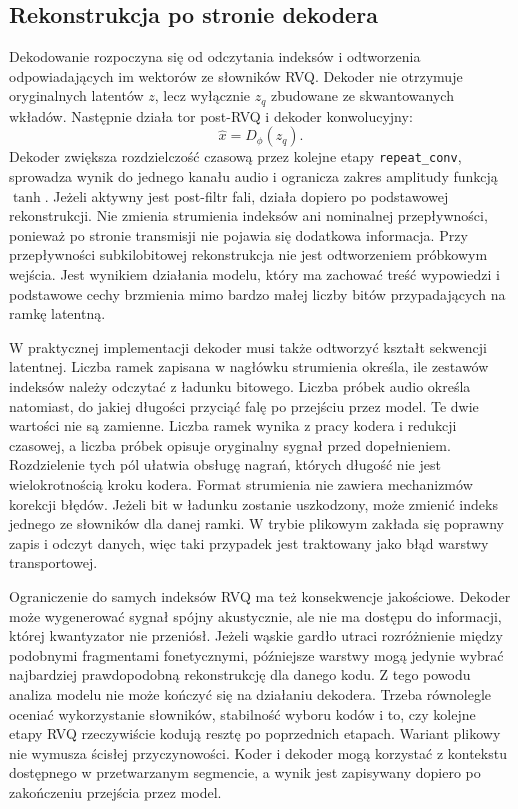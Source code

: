 \subsection{Rekonstrukcja po stronie dekodera}

Dekodowanie rozpoczyna się od odczytania indeksów i odtworzenia odpowiadających im wektorów ze słowników RVQ. Dekoder nie otrzymuje oryginalnych latentów \(z\), lecz wyłącznie \(z_q\) zbudowane ze skwantowanych wkładów. Następnie działa tor post-RVQ i dekoder konwolucyjny:
\[
\hat{x} = D_\phi(z_q).
\]
Dekoder zwiększa rozdzielczość czasową przez kolejne etapy \texttt{repeat\_conv}, sprowadza wynik do jednego kanału audio i ogranicza zakres amplitudy funkcją \(\tanh\). Jeżeli aktywny jest post-filtr fali, działa dopiero po podstawowej rekonstrukcji. Nie zmienia strumienia indeksów ani nominalnej przepływności, ponieważ po stronie transmisji nie pojawia się dodatkowa informacja. Przy przepływności subkilobitowej rekonstrukcja nie jest odtworzeniem próbkowym wejścia. Jest wynikiem działania modelu, który ma zachować treść wypowiedzi i podstawowe cechy brzmienia mimo bardzo małej liczby bitów przypadających na ramkę latentną.

W praktycznej implementacji dekoder musi także odtworzyć kształt sekwencji latentnej. Liczba ramek zapisana w nagłówku strumienia określa, ile zestawów indeksów należy odczytać z ładunku bitowego. Liczba próbek audio określa natomiast, do jakiej długości przyciąć falę po przejściu przez model. Te dwie wartości nie są zamienne. Liczba ramek wynika z pracy kodera i redukcji czasowej, a liczba próbek opisuje oryginalny sygnał przed dopełnieniem. Rozdzielenie tych pól ułatwia obsługę nagrań, których długość nie jest wielokrotnością kroku kodera. Format strumienia nie zawiera mechanizmów korekcji błędów. Jeżeli bit w ładunku zostanie uszkodzony, może zmienić indeks jednego ze słowników dla danej ramki. W trybie plikowym zakłada się poprawny zapis i odczyt danych, więc taki przypadek jest traktowany jako błąd warstwy transportowej.

Ograniczenie do samych indeksów RVQ ma też konsekwencje jakościowe. Dekoder może wygenerować sygnał spójny akustycznie, ale nie ma dostępu do informacji, której kwantyzator nie przeniósł. Jeżeli wąskie gardło utraci rozróżnienie między podobnymi fragmentami fonetycznymi, późniejsze warstwy mogą jedynie wybrać najbardziej prawdopodobną rekonstrukcję dla danego kodu. Z tego powodu analiza modelu nie może kończyć się na działaniu dekodera. Trzeba równolegle oceniać wykorzystanie słowników, stabilność wyboru kodów i to, czy kolejne etapy RVQ rzeczywiście kodują resztę po poprzednich etapach. Wariant plikowy nie wymusza ścisłej przyczynowości. Koder i dekoder mogą korzystać z kontekstu dostępnego w przetwarzanym segmencie, a wynik jest zapisywany dopiero po zakończeniu przejścia przez model.


